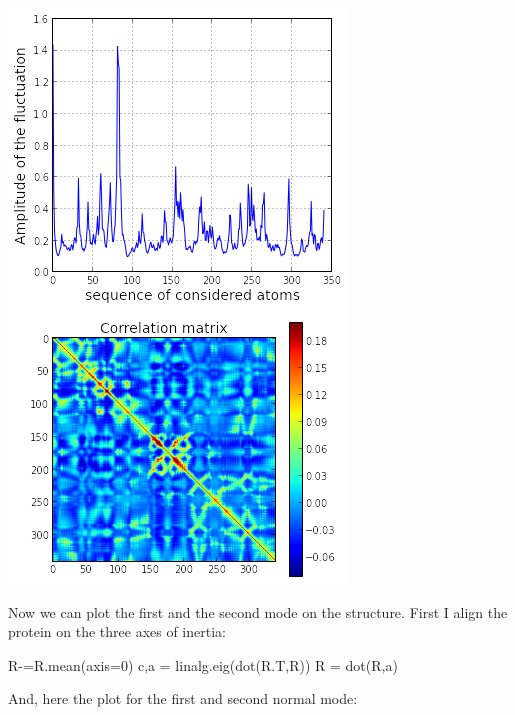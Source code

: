 \documentclass[
]{article}
\newenvironment{Shaded}{}{}
\newcommand{\DecValTok}[1]{\textcolor[rgb]{0.25,0.63,0.44}{#1}}
\newcommand{\NormalTok}[1]{#1}
\newcommand{\OperatorTok}[1]{\textcolor[rgb]{0.40,0.40,0.40}{#1}}
\begin{document}
\includegraphics{figures/normal_modes_24_0.png}

Now we can plot the first and the second mode on the structure. First I
align the protein on the three axes of inertia:

\begin{Shaded}
\begin{Highlighting}[]
\NormalTok{R}\OperatorTok{{-}=}\NormalTok{R.mean(axis}\OperatorTok{=}\DecValTok{0}\NormalTok{)}
\NormalTok{c,a }\OperatorTok{=}\NormalTok{ linalg.eig(dot(R.T,R))}
\NormalTok{R }\OperatorTok{=}\NormalTok{ dot(R,a)}
\end{Highlighting}
\end{Shaded}

And, here the plot for the first and second normal mode:
\end{document}
